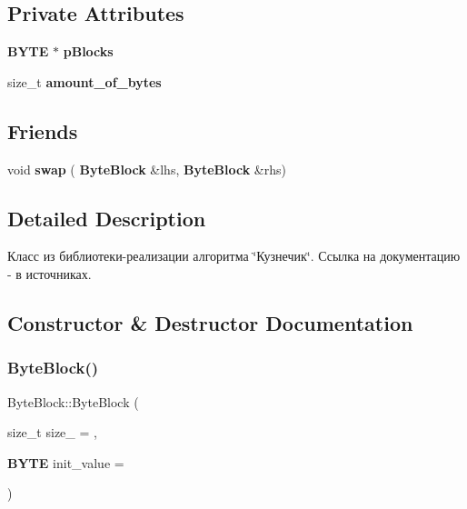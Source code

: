 \subsection*{Private Attributes}
\begin{DoxyCompactItemize}
\item 
\textbf{ B\+Y\+TE} $\ast$ \textbf{ p\+Blocks}
\item 
size\+\_\+t \textbf{ amount\+\_\+of\+\_\+bytes}
\end{DoxyCompactItemize}
\subsection*{Friends}
\begin{DoxyCompactItemize}
\item 
void \textbf{ swap} (\textbf{ Byte\+Block} \&lhs, \textbf{ Byte\+Block} \&rhs)
\end{DoxyCompactItemize}


\subsection{Detailed Description}
Класс из библиотеки-\/реализации алгоритма \char`\"{}Кузнечик\char`\"{}. Ссылка на документацию -\/ в источниках. 

\subsection{Constructor \& Destructor Documentation}
\mbox{\label{class_byte_block_a39169d96104d9cb1016065e19c2b032e}} 
\subsubsection{Byte\+Block()\hspace{0.1cm}{\footnotesize\ttfamily [1/3]}}
{\footnotesize\ttfamily Byte\+Block\+::\+Byte\+Block (\begin{DoxyParamCaption}\item[{size\+\_\+t}]{size\+\_\+ = {},  }\item[{\textbf{ B\+Y\+TE}}]{init\+\_\+value = {} }\end{DoxyParamCaption})}

\mbox{\label{class_byte_block_aac1e3e7f8030c711a76aec7f716ce6ef}} 
